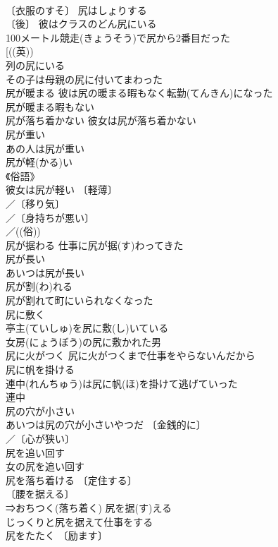 \documentclass[8pt]{extreport}
\begin{document}
\begin{CJK}{UTF8}{min}
\\	〔衣服のすそ〕 尻はしょりする 
\\	〔後〕 彼はクラスのどん尻にいる 
\\	100メートル競走(きょうそう)で尻から2番目だった 
\\	[((英))
\\	列の尻にいる 
\\	その子は母親の尻に付いてまわった 
\\	尻が暖まる 彼は尻の暖まる暇もなく転勤(てんきん)になった 
\\	尻が暖まる暇もない 
\\	尻が落ち着かない 彼女は尻が落ち着かない 
\\	尻が重い 
\\	あの人は尻が重い 
\\	尻が軽(かる)い 
\\	《俗語》 
\\	彼女は尻が軽い 〔軽薄〕
\\	／〔移り気〕
\\	／〔身持ちが悪い〕
\\	／((俗)) 
\\	尻が据わる 仕事に尻が据(す)わってきた 
\\	尻が長い 
\\	あいつは尻が長い 
\\	尻が割(わ)れる 
\\	尻が割れて町にいられなくなった 
\\	尻に敷く 
\\	亭主(ていしゅ)を尻に敷(し)いている 
\\	女房(にょうぼう)の尻に敷かれた男 
\\	尻に火がつく 尻に火がつくまで仕事をやらないんだから 
\\	尻に帆を掛ける 
\\	連中(れんちゅう)は尻に帆(ほ)を掛けて逃げていった 
\\	連中 
\\	尻の穴が小さい 
\\	あいつは尻の穴が小さいやつだ 〔金銭的に〕
\\	／〔心が狭い〕
\\	尻を追い回す 
\\	女の尻を追い回す 
\\	尻を落ち着ける 〔定住する〕
\\	〔腰を据える〕
\\	⇒おちつく(落ち着く) 尻を据(す)える 
\\	じっくりと尻を据えて仕事をする 
\\	尻をたたく 〔励ます〕

\end{CJK}
\end{document}
